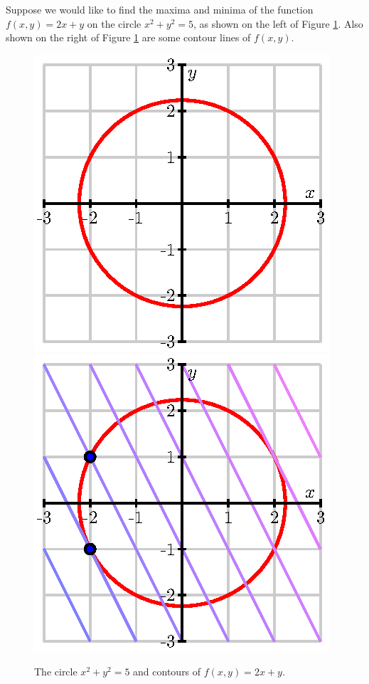 \begin{pa} \label{PA:10.8} 
  Suppose we would like to find the maxima and minima of the function
  $f(x,y) = 2x + y$ on the circle $x^2+y^2=5$, as shown on the left of
  Figure \ref{F:10.8.preview}.  Also shown on the right of Figure
  \ref{F:10.8.preview} are some contour lines of $f(x,y)$.

  \begin{figure}[ht]
  \begin{center}
    \includegraphics{figures/fig_10_8_preview.eps}
    \hspace*{20pt}
    \includegraphics{figures/fig_10_8_preview_contour.eps}
  \end{center}
  \caption{The circle $x^2+y^2=5$ and contours of $f(x,y) = 2x+y$.}
  \label{F:10.8.preview}
\end{figure}


\end{pa}
